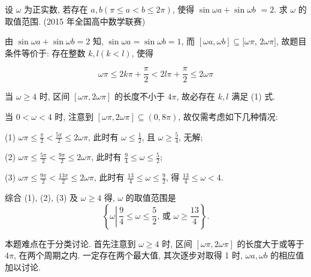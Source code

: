 \begin{example}
	设 $\omega$ 为正实数, 若存在 $a ,  b(\pi \leqslant a<b \leqslant 2 \pi)$, 使得 $\sin \omega a+\sin \omega b$ $=2$. 求 $\omega$ 的取值范围. (2015 年全国高中数学联赛)
\end{example}
\begin{solution}
	由 $\sin \omega a+\sin \omega b=2$ 知, $\sin \omega a=\sin \omega b=1$, 而 $[\omega a, \omega b] \subseteq[\omega \pi$, $2 \omega \pi]$, 故题目条件等价于: 存在整数 $k ,  l(k<l)$, 使得

	\begin{equation*}
		\omega \pi \leqslant 2 k \pi+\frac{\pi}{2}<2 l \pi+\frac{\pi}{2} \leqslant 2 \omega \pi \tag{1}
	\end{equation*}

	当 $\omega \geqslant 4$ 时, 区间 $[\omega \pi, 2 \omega \pi]$ 的长度不小于 $4 \pi$, 故必存在 $k ,  l$ 满足 (1) 式.

	当 $0<\omega<4$ 时, 注意到 $[\omega \pi, 2 \omega \pi] \subseteq(0,8 \pi)$, 故仅需考虑如下几种情况:

	(1) $\omega \pi \leqslant \frac{\pi}{2}<\frac{5 \pi}{2} \leqslant 2 \omega \pi$, 此时有 $\omega \leqslant \frac{1}{2}$, 且 $\omega \geqslant \frac{5}{4}$, 无解;

	(2) $\omega \pi \leqslant \frac{5 \pi}{2}<\frac{9 \pi}{2} \leqslant 2 \omega \pi$, 此时有 $\frac{9}{4} \leqslant \omega \leqslant \frac{5}{2}$;

	(3) $\omega \pi \leqslant \frac{9 \pi}{2}<\frac{13 \pi}{2} \leqslant 2 \omega \pi$, 此时有 $\frac{13}{4} \leqslant \omega \leqslant \frac{9}{2}$, 得 $\frac{13}{4} \leqslant \omega<4$.

	综合 (1), (2), (3) 及 $\omega \geqslant 4$ 得, $\omega$ 的取值范围是
	$$
		\left\{\omega \left\lvert\, \frac{9}{4} \leqslant \omega \leqslant \frac{5}{2}\right. \text {, 或 } \omega \geqslant \frac{13}{4}\right\} .
	$$
\end{solution}
\begin{note}
	本题难点在于分类讨论. 首先注意到 $\omega \geqslant 4$ 时, 区间 $[\omega \pi, 2 \omega \pi]$ 的长度大于或等于 $4 \pi$, 在两个周期之内. 一定存在两个最大值, 其次逐步对取得 1 时, $\omega a ,  \omega b$ 的相应值加以讨论.
\end{note}

